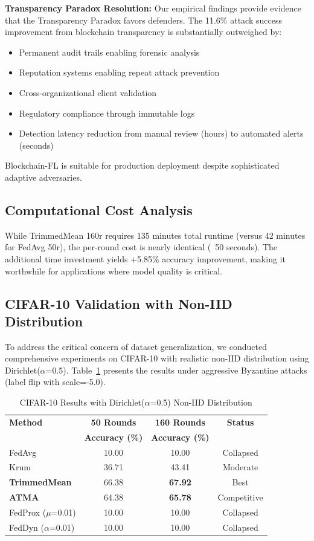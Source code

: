 \documentclass[12pt,a4paper,onecolumn]{article}
\begin{document}
\textbf{Transparency Paradox Resolution:} Our empirical findings provide evidence that the Transparency Paradox favors defenders. The 11.6\% attack success improvement from blockchain transparency is substantially outweighed by:
\begin{itemize}
    \item Permanent audit trails enabling forensic analysis
    \item Reputation systems enabling repeat attack prevention
    \item Cross-organizational client validation
    \item Regulatory compliance through immutable logs
    \item Detection latency reduction from manual review (hours) to automated alerts (seconds)
\end{itemize}

Blockchain-FL is suitable for production deployment despite sophisticated adaptive adversaries.

\subsection{Computational Cost Analysis}

While TrimmedMean 160r requires 135 minutes total runtime (versus 42 minutes for FedAvg 50r), the per-round cost is nearly identical (~50 seconds). The additional time investment yields +5.85\% accuracy improvement, making it worthwhile for applications where model quality is critical.

\subsection{CIFAR-10 Validation with Non-IID Distribution}
\label{sec:cifar10}

To address the critical concern of dataset generalization, we conducted comprehensive experiments on CIFAR-10 with realistic non-IID distribution using Dirichlet($\alpha$=0.5). Table~\ref{tab:cifar10_results} presents the results under aggressive Byzantine attacks (label flip with scale=-5.0).

\begin{table}[t]
\caption{CIFAR-10 Results with Dirichlet($\alpha$=0.5) Non-IID Distribution}
\label{tab:cifar10_results}
\centering
\begin{tabular}{lccc}
\toprule
\textbf{Method} & \textbf{50 Rounds} & \textbf{160 Rounds} & \textbf{Status} \\
& \textbf{Accuracy (\%)} & \textbf{Accuracy (\%)} & \\
\midrule
FedAvg & 10.00 & 10.00 & Collapsed \\
Krum & 36.71 & 43.41 & Moderate \\
\textbf{TrimmedMean} & 66.38 & \textbf{67.92} & Best \\
\textbf{ATMA} & 64.38 & \textbf{65.78} & Competitive \\
FedProx ($\mu$=0.01) & 10.00 & 10.00 & Collapsed \\
FedDyn ($\alpha$=0.01) & 10.00 & 10.00 & Collapsed \\
\bottomrule
\end{tabular}
\end{table}
\end{document}
